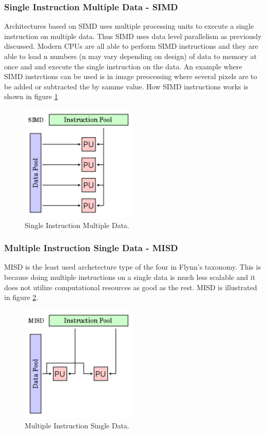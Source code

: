 \subsubsection*{Single Instruction Multiple Data - SIMD}
Architectures based on SIMD uses  multiple processing units to execute a single instruction on multiple data. Thus SIMD uses data level parallelism as previously discussed. Modern CPUs are all able to perform SIMD instructions and they are able to load n numbers (n may vary depending on design) of data to memory at once and and execute the single instruction on the data. An example where SIMD instrctions can be used is in image preocessing where several pixels are to be added or subtracted the by samme value. How SIMD instructions works is shown in figure \ref{SIMD}
\begin{figure}[h!]
\centering
\includegraphics[width=0.50\textwidth]{backgroundTheory/parallel/SIMD}
\caption{Single Instruction Multiple Data.}
\label{SIMD}
\end{figure}

\subsubsection*{Multiple Instruction Single Data - MISD}
MISD is the least used archetecture type of the four in Flynn's taxonomy. This is because doing multiple instructions on a single data is much less scalable and it does not utilize computational resources as good as the rest. MISD is illustrated in figure \ref{MISD}.
\begin{figure}[h!]
\centering
\includegraphics[width=0.50\textwidth]{backgroundTheory/parallel/MISD}
\caption{Multiple Instruction Single Data.}
\label{MISD}
\end{figure}

